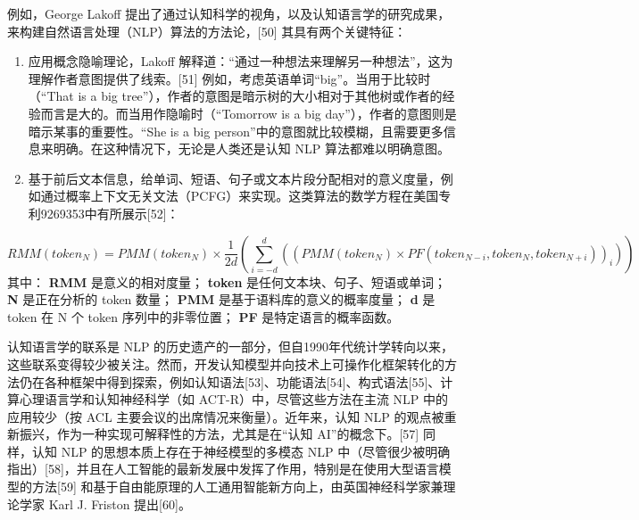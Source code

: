 例如，George Lakoff 提出了通过认知科学的视角，以及认知语言学的研究成果，来构建自然语言处理（NLP）算法的方法论，[50] 其具有两个关键特征：

\begin{enumerate}
\item 应用概念隐喻理论，Lakoff 解释道：“通过一种想法来理解另一种想法”，这为理解作者意图提供了线索。[51] 例如，考虑英语单词“big”。当用于比较时（“That is a big tree”），作者的意图是暗示树的大小相对于其他树或作者的经验而言是大的。而当用作隐喻时（“Tomorrow is a big day”），作者的意图则是暗示某事的重要性。“She is a big person”中的意图就比较模糊，且需要更多信息来明确。在这种情况下，无论是人类还是认知 NLP 算法都难以明确意图。
\item 基于前后文本信息，给单词、短语、句子或文本片段分配相对的意义度量，例如通过概率上下文无关文法（PCFG）来实现。这类算法的数学方程在美国专利9269353中有所展示[52]：
\end{enumerate}  
   \[
   RMM(token_{N}) = PMM(token_{N}) \times \frac{1}{2d} \left( \sum_{i=-d}^{d} \left( (PMM(token_{N}) \times PF(token_{N-i}, token_{N}, token_{N+i}))_i \right) \right)~
   \]
   其中：
  \textbf{RMM} 是意义的相对度量；
  \textbf{token} 是任何文本块、句子、短语或单词；
  \textbf{N} 是正在分析的 token 数量；
  \textbf{PMM} 是基于语料库的意义的概率度量；
  \textbf{d} 是 token 在 N 个 token 序列中的非零位置；
  \textbf{PF} 是特定语言的概率函数。

认知语言学的联系是 NLP 的历史遗产的一部分，但自1990年代统计学转向以来，这些联系变得较少被关注。然而，开发认知模型并向技术上可操作化框架转化的方法仍在各种框架中得到探索，例如认知语法[53]、功能语法[54]、构式语法[55]、计算心理语言学和认知神经科学（如 ACT-R）中，尽管这些方法在主流 NLP 中的应用较少（按 ACL 主要会议的出席情况来衡量）。近年来，认知 NLP 的观点被重新振兴，作为一种实现可解释性的方法，尤其是在“认知 AI”的概念下。[57] 同样，认知 NLP 的思想本质上存在于神经模型的多模态 NLP 中（尽管很少被明确指出）[58]，并且在人工智能的最新发展中发挥了作用，特别是在使用大型语言模型的方法[59] 和基于自由能原理的人工通用智能新方向上，由英国神经科学家兼理论学家 Karl J. Friston 提出[60]。

